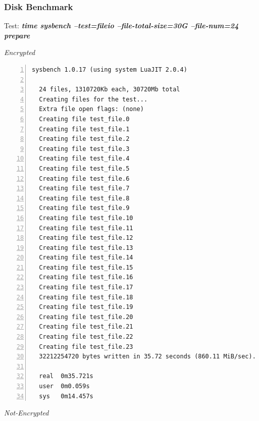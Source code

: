 \subsubsection{Disk Benchmark}
\begin{center}
  Test: \textbf{\textit{time sysbench --test=fileio --file-total-size=30G --file-num=24 prepare}}  
\end{center}
\vspace*{-\baselineskip}
\noindent\begin{minipage}[t]{0.45\linewidth}
  \centering
  \textit{Encrypted}
  \begin{lstlisting}[basicstyle=\tiny,frame=single, numbers=left, label=cpu_test1]
  sysbench 1.0.17 (using system LuaJIT 2.0.4)

  24 files, 1310720Kb each, 30720Mb total
  Creating files for the test...
  Extra file open flags: (none)
  Creating file test_file.0
  Creating file test_file.1
  Creating file test_file.2
  Creating file test_file.3
  Creating file test_file.4
  Creating file test_file.5
  Creating file test_file.6
  Creating file test_file.7
  Creating file test_file.8
  Creating file test_file.9
  Creating file test_file.10
  Creating file test_file.11
  Creating file test_file.12
  Creating file test_file.13
  Creating file test_file.14
  Creating file test_file.15
  Creating file test_file.16
  Creating file test_file.17
  Creating file test_file.18
  Creating file test_file.19
  Creating file test_file.20
  Creating file test_file.21
  Creating file test_file.22
  Creating file test_file.23
  32212254720 bytes written in 35.72 seconds (860.11 MiB/sec).

  real	0m35.721s
  user	0m0.059s
  sys	0m14.457s
  \end{lstlisting}
\end{minipage}
\hspace{0.5cm}
\noindent\begin{minipage}[t]{0.45\linewidth}
  \centering
  \textit{Not-Encrypted}
  \begin{lstlisting}[basicstyle=\tiny,frame=single, label=cpu_test2]

  \end{lstlisting}
\end{minipage}

